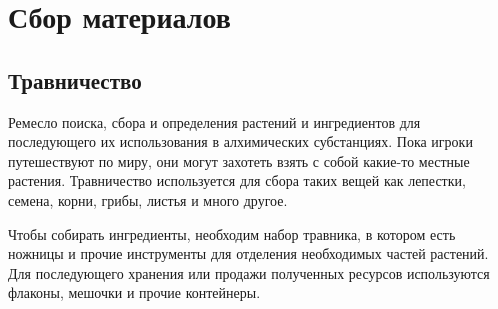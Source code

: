 \documentclass[a4paper, 9pt, twocolumn]{book}
\begin{document}

	\tableofcontents
	
	\chapter{Сбор материалов}
	
	\section{Травничество}
	
	Ремесло поиска, сбора и определения растений и ингредиентов для последующего их использования в алхимических субстанциях. Пока игроки путешествуют по миру, они могут захотеть взять с собой какие-то местные растения. Травничество используется для сбора таких вещей как лепестки, семена, корни, грибы, листья и много другое.
	
	Чтобы собирать ингредиенты, необходим набор травника, в котором есть ножницы и прочие инструменты для отделения необходимых частей растений. Для последующего хранения или продажи полученных ресурсов используются флаконы, мешочки и прочие контейнеры.
	
\end{document}
